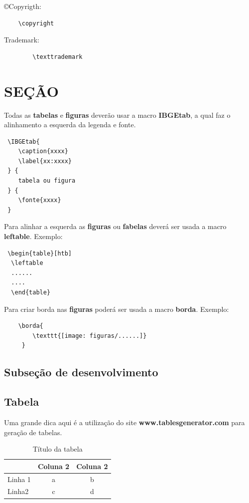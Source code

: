 \copyright Copyrigth:
	\begin{verbatim}
	\copyright
	\end{verbatim}
	
	\texttrademark Trademark:
		\begin{verbatim}
		\texttrademark
		\end{verbatim}
\section{SEÇÃO}

 Todas as \textbf{tabelas} e \textbf{figuras} deverão usar a macro \textbf{IBGEtab}, a qual faz o alinhamento a esquerda da legenda e fonte.
 \begin{verbatim}
 \IBGEtab{
 	\caption{xxxx} 
 	\label{xx:xxxx}
 } {
 	tabela ou figura
 } {
 	\fonte{xxxx}
 }
 \end{verbatim} 
 
 Para alinhar a esquerda as \textbf{figuras} ou \textbf{fabelas} deverá ser usada a macro  \textbf{leftable}. Exemplo:
 \begin{verbatim}
 \begin{table}[htb]
  \leftable
  ......
  ....
  \end{table}
 \end{verbatim}
 
 Para criar borda nas \textbf{figuras} poderá ser usada a macro \textbf{borda}. Exemplo:
 \begin{verbatim}
 	\borda{
  		\texttt{[image: figuras/......]}
     }
 \end{verbatim}
\subsection{Subseção de desenvolvimento}

\lipsum[1-1]


\subsection{Tabela}

Uma grande dica aqui é a utilização do site \textbf{www.tablesgenerator.com} para geração de tabelas.

\begin{table}[!htpb]
	\centering
	\caption{Título da tabela}
	\label{my-label}
	\begin{tabular}{lcc}
		& \multicolumn{1}{l}{Coluna 2} & \multicolumn{1}{l}{Coluna 2} \\ \hline
		Linha 1 & a                            & b                            \\ \hline
		Linha2  & c                            & d                           
	\end{tabular}


\end{table}
   






